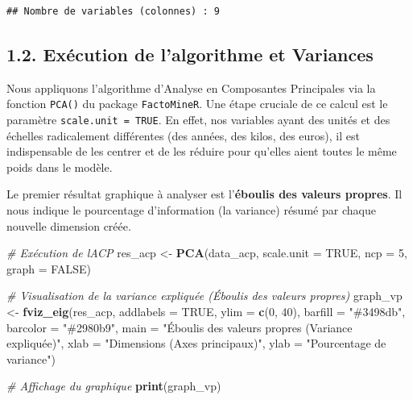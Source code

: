 \documentclass[
]{article}
\newenvironment{Shaded}{\begin{snugshade}}{\end{snugshade}}
\newcommand{\AttributeTok}[1]{\textcolor[rgb]{0.13,0.29,0.53}{#1}}
\newcommand{\CommentTok}[1]{\textcolor[rgb]{0.56,0.35,0.01}{\textit{#1}}}
\newcommand{\ConstantTok}[1]{\textcolor[rgb]{0.56,0.35,0.01}{#1}}
\newcommand{\DecValTok}[1]{\textcolor[rgb]{0.00,0.00,0.81}{#1}}
\newcommand{\FunctionTok}[1]{\textcolor[rgb]{0.13,0.29,0.53}{\textbf{#1}}}
\newcommand{\NormalTok}[1]{#1}
\newcommand{\OtherTok}[1]{\textcolor[rgb]{0.56,0.35,0.01}{#1}}
\newcommand{\StringTok}[1]{\textcolor[rgb]{0.31,0.60,0.02}{#1}}
\begin{document}
\begin{verbatim}
## Nombre de variables (colonnes) : 9
\end{verbatim}

\subsection{1.2. Exécution de l'algorithme et
Variances}\label{exuxe9cution-de-lalgorithme-et-variances}

Nous appliquons l'algorithme d'Analyse en Composantes Principales via la
fonction \texttt{PCA()} du package \texttt{FactoMineR}. Une étape
cruciale de ce calcul est le paramètre \texttt{scale.unit\ =\ TRUE}. En
effet, nos variables ayant des unités et des échelles radicalement
différentes (des années, des kilos, des euros), il est indispensable de
les centrer et de les réduire pour qu'elles aient toutes le même poids
dans le modèle.

Le premier résultat graphique à analyser est l'\textbf{éboulis des
valeurs propres}. Il nous indique le pourcentage d'information (la
variance) résumé par chaque nouvelle dimension créée.

\begin{Shaded}
\begin{Highlighting}[]
\CommentTok{\# Exécution de l\textquotesingle{}ACP }
\NormalTok{res\_acp }\OtherTok{\textless{}{-}} \FunctionTok{PCA}\NormalTok{(data\_acp, }\AttributeTok{scale.unit =} \ConstantTok{TRUE}\NormalTok{, }\AttributeTok{ncp =} \DecValTok{5}\NormalTok{, }\AttributeTok{graph =} \ConstantTok{FALSE}\NormalTok{)}

\CommentTok{\# Visualisation de la variance expliquée (Éboulis des valeurs propres)}
\NormalTok{graph\_vp }\OtherTok{\textless{}{-}} \FunctionTok{fviz\_eig}\NormalTok{(res\_acp, }
                     \AttributeTok{addlabels =} \ConstantTok{TRUE}\NormalTok{, }
                     \AttributeTok{ylim =} \FunctionTok{c}\NormalTok{(}\DecValTok{0}\NormalTok{, }\DecValTok{40}\NormalTok{),}
                     \AttributeTok{barfill =} \StringTok{"\#3498db"}\NormalTok{, }
                     \AttributeTok{barcolor =} \StringTok{"\#2980b9"}\NormalTok{,}
                     \AttributeTok{main =} \StringTok{"Éboulis des valeurs propres (Variance expliquée)"}\NormalTok{,}
                     \AttributeTok{xlab =} \StringTok{"Dimensions (Axes principaux)"}\NormalTok{,}
                     \AttributeTok{ylab =} \StringTok{"Pourcentage de variance"}\NormalTok{)}

\CommentTok{\# Affichage du graphique}
\FunctionTok{print}\NormalTok{(graph\_vp)}
\end{Highlighting}
\end{Shaded}
\end{document}
